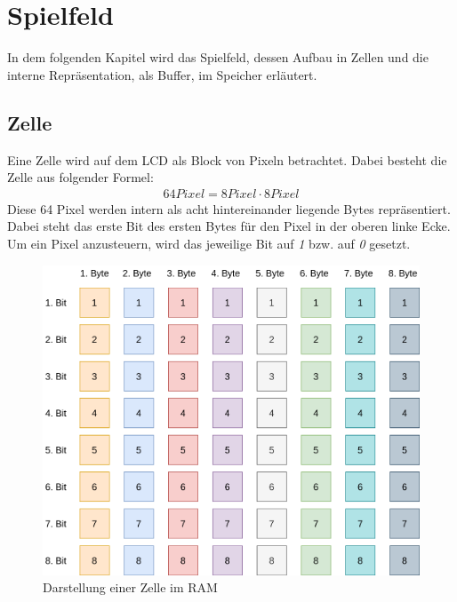 \section{Spielfeld}
    In dem folgenden Kapitel wird das Spielfeld, dessen Aufbau in Zellen und die interne Repräsentation, 
    als Buffer, im Speicher erläutert.


    \subsection{Zelle}
        Eine Zelle wird auf dem LCD als Block von Pixeln betrachtet.
        Dabei besteht die Zelle aus folgender Formel:
        \begin{align}
        64 Pixel = 8 Pixel \cdot 8 Pixel
        \end{align}
        Diese 64 Pixel werden intern als acht hintereinander liegende Bytes repräsentiert.
        Dabei steht das erste Bit des ersten Bytes für den Pixel in der oberen linke Ecke.
        Um ein Pixel anzusteuern, wird das jeweilige Bit auf \textit{1} bzw. auf \textit{0} gesetzt.
        \begin{figure}[H]
            \centering
            \includegraphics[scale=0.25]{img/zelle.png}    
            \caption{Darstellung einer Zelle im RAM}
        \end{figure}
    

